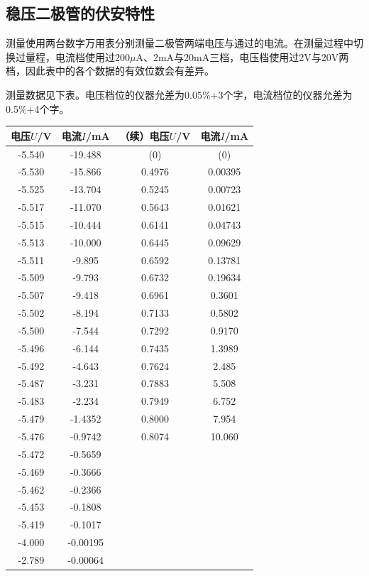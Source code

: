 \documentclass[UTF8]{ctexart}
\begin{document}
\subsection{稳压二极管的伏安特性}

测量使用两台数字万用表分别测量二极管两端电压与通过的电流。在测量过程中切换过量程，电流档使用过$200\mu$A、2mA与20mA三档，电压档使用过2V与20V两档，因此表中的各个数据的有效位数会有差异。

测量数据见下表。电压档位的仪器允差为0.05\%+3个字，电流档位的仪器允差为0.5\%+4个字。

\begin{tabular*}{0.95\textwidth}{@{\extracolsep{\fill}}c c|c c}
\hline
电压$U$/V	&电流$I$/mA	&（续）电压$U$/V	&电流$I$/mA\\
\hline
-5.540	&-19.488	&(0)	&(0)
\\
-5.530	&-15.866	&0.4976	&0.00395
\\
-5.525	&-13.704	&0.5245	&0.00723
\\
-5.517	&-11.070	&0.5643	&0.01621
\\
-5.515	&-10.444	&0.6141	&0.04743
\\
-5.513	&-10.000	&0.6445	&0.09629
\\
-5.511	&-9.895	&0.6592	&0.13781
\\
-5.509	&-9.793	&0.6732	&0.19634
\\
-5.507	&-9.418	&0.6961	&0.3601
\\
-5.502	&-8.194	&0.7133	&0.5802
\\
-5.500	&-7.544	&0.7292	&0.9170
\\
-5.496	&-6.144	&0.7435	&1.3989
\\
-5.492	&-4.643	&0.7624	&2.485
\\
-5.487	&-3.231	&0.7883	&5.508
\\
-5.483	&-2.234	&0.7949	&6.752
\\
-5.479	&-1.4352	&0.8000	&7.954
\\
-5.476	&-0.9742	&0.8074	&10.060
\\
-5.472	&-0.5659	&	&
\\
-5.469	&-0.3666	&	&
\\
-5.462	&-0.2366	&	&
\\
-5.453	&-0.1808	&	&
\\
-5.419	&-0.1017	&	&
\\
-4.000	&-0.00195	&	&
\\
-2.789	&-0.00064	&	&
\\
\hline

\end{tabular*}
\end{document}
